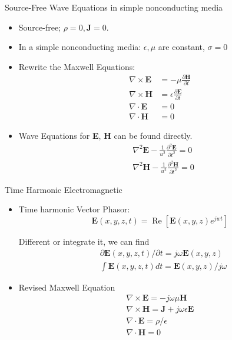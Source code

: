 \documentclass[xcolor={dvipsnames}]{beamer}
\begin{document}
\begin{frame}{Source-Free Wave Equations in simple nonconducting media}
\begin{itemize}
	\item Source-free; $\rho =0,\mathbf{J}=0$.
	\item In a simple nonconducting media: $\epsilon,\mu$ are constant, $\sigma = 0$
	\item Rewrite the Maxwell Equations:
	$$
\begin{aligned}
\nabla \times \mathbf{E} &=-\mu \frac{\partial \mathbf{H}}{\partial t} \\
\nabla \times \mathbf{H} &=\epsilon \frac{\partial \mathbf{E}}{\partial t} \\
\nabla \cdot \mathbf{E} &=0 \\
\nabla \cdot \mathbf{H} &=0
\end{aligned}
$$
\item Wave Equations for \textbf{E}, \textbf{H} can be found directly.
$$
\begin{aligned}
&\nabla^{2} \mathbf{E}-\frac{1}{u^{2}} \frac{\partial^{2} \mathbf{E}}{\partial t^{2}}=0 \\
&\nabla^{2} \mathbf{H}-\frac{1}{u^{2}} \frac{\partial^{2} \mathbf{H}}{\partial t^{2}}=0
\end{aligned}
$$
\end{itemize}
\end{frame}
\begin{frame}{Time Harmonic Electromagnetic}
\begin{itemize}
	\item Time harmonic Vector Phasor: $$
\mathbf{E}(x, y, z, t)=\operatorname{Re}\left[\mathbf{E}(x, y, z) e^{j w t}\right]
$$

Different or integrate it, we can find
$$
\begin{aligned}
&\partial \mathbf{E}(x, y, z, t) / \partial t=j \omega \mathbf{E}(x, y, z) \\
&\int \mathbf{E}(x, y, z, t) d t=\mathbf{E}(x, y, z) / j \omega
\end{aligned}
$$
\item Revised Maxwell Equation
$$
\begin{gathered}
\nabla \times \mathbf{E}=-j \omega \mu \mathbf{H} \\
\nabla \times \mathbf{H}=\mathbf{J}+j \omega \epsilon \mathbf{E} \\
\nabla \cdot \mathbf{E}=\rho / \epsilon \\
\nabla \cdot \mathbf{H}=0
\end{gathered}
$$
\end{itemize}
\end{frame}
\end{document}
